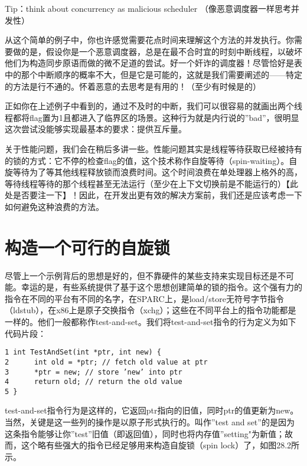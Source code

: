 \begin{tcolorbox}[colframe=grey,colback= grey,arc=0pt,left=6pt,right=6pt,top=6pt,bottom=6pt,boxsep=0pt]
\begin{center}Tip：think about concurrency as malicious scheduler （像恶意调度器一样思考并发性）\end{center}
从这个简单的例子中，你也许感觉需要花点时间来理解这个方法的并发执行。你需要做的是，假设你是一个恶意调度器，总是在最不合时宜的时刻中断线程，以破坏他们为构造同步原语而做的微不足道的尝试。好一个奸诈的调度器！尽管恰好是表中的那个中断顺序的概率不大，但是它是可能的，这就是我们需要阐述的——特定的方法是行不通的。怀着恶意的去思考是有用的！（至少有时候是的）
\end{tcolorbox}

正如你在上述例子中看到的，通过不及时的中断，我们可以很容易的就画出两个线程都将flag置为1且都进入了临界区的场景。这种行为就是内行说的”bad”，很明显这次尝试没能够实现最基本的要求：提供互斥量。

关于性能问题，我们会在稍后多讲一些。性能问题其实是线程等待获取已经被持有的锁的方式：它不停的检查flag的值，这个技术称作自旋等待（spin-waiting）。自旋等待为了等其他线程释放锁而浪费时间。这个时间浪费在单处理器上格外的高，等待线程等待的那个线程甚至无法运行（至少在上下文切换前是不能运行的）【此处是否要注一下】！因此，在开发出更有效的解决方案前，我们还是应该考虑一下如何避免这种浪费的方法。


\section{构造一个可行的自旋锁}
尽管上一个示例背后的思想是好的，但不靠硬件的某些支持来实现目标还是不可能。幸运的是，有些系统提供了基于这个思想创建简单的锁的指令。这个强有力的指令在不同的平台有不同的名字，在SPARC上，是load/store无符号字节指令（ldstub），在x86上是原子交换指令（xchg）；这些在不同平台上的指令功能都是一样的。他们一般都称作test-and-set。我们将test-and-set指令的行为定义为如下代码片段：
\begin{verbatim}
1 int TestAndSet(int *ptr, int new) {
2      int old = *ptr; // fetch old value at ptr
3      *ptr = new; // store ’new’ into ptr
4      return old; // return the old value
5 }
\end{verbatim}

test-and-set指令行为是这样的，它返回ptr指向的旧值，同时ptr的值更新为new。当然，关键是这一些列的操作是以原子形式执行的。叫作”test and set”的是因为这条指令能够让你”test”旧值（即返回值），同时也将内存值”setting"为新值；故而，这个略有些强大的指令已经足够用来构造自旋锁（spin lock）了，如图28.2所示。

